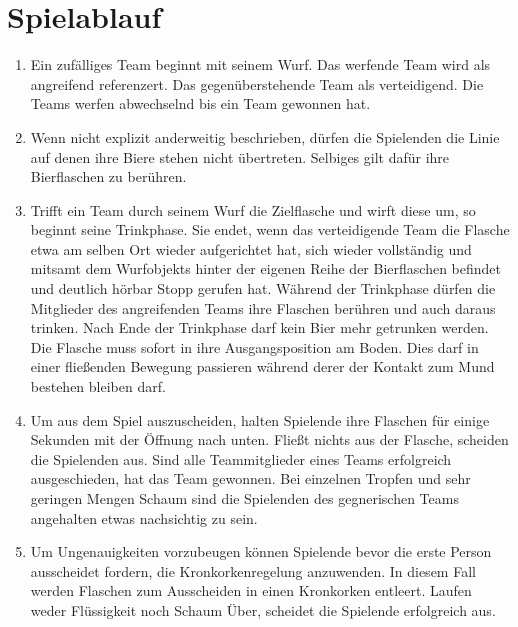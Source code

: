\section{Spielablauf}
\begin{enumerate}[label={(\arabic*)}]    
    \item
    Ein zufälliges Team beginnt mit seinem Wurf.
    Das werfende Team wird als \glqq{} angreifend \grqq{} referenzert.
    Das gegenüberstehende Team als \glqq{} verteidigend\grqq{}.
    Die Teams werfen abwechselnd bis ein Team gewonnen hat.

    \item
    Wenn nicht explizit anderweitig beschrieben, dürfen die Spielenden die Linie auf denen ihre Biere stehen nicht übertreten.
    Selbiges gilt dafür ihre Bierflaschen zu berühren.

    \item
    Trifft ein Team durch seinem Wurf die Zielflasche und wirft diese um, so beginnt seine Trinkphase.
    Sie endet, wenn das verteidigende Team die Flasche etwa am selben Ort wieder aufgerichtet hat, sich wieder vollständig und mitsamt dem Wurfobjekts hinter der eigenen Reihe der Bierflaschen befindet und deutlich hörbar \glqq{} Stopp\grqq{} gerufen hat.
    Während der Trinkphase dürfen die Mitglieder des angreifenden Teams ihre Flaschen berühren und auch daraus trinken.
    Nach Ende der Trinkphase darf kein Bier mehr getrunken werden.
    Die Flasche muss sofort in ihre Ausgangsposition am Boden.
    Dies darf in einer fließenden Bewegung passieren während derer der Kontakt zum Mund bestehen bleiben darf.

    \item
    Um aus dem Spiel auszuscheiden, halten Spielende ihre Flaschen für einige Sekunden mit der Öffnung nach unten.
    Fließt nichts aus der Flasche, scheiden die Spielenden aus.
    Sind alle Teammitglieder eines Teams erfolgreich ausgeschieden, hat das Team gewonnen.
    Bei einzelnen Tropfen und sehr geringen Mengen Schaum sind die Spielenden des gegnerischen Teams angehalten etwas nachsichtig zu sein.

    \item
    Um Ungenauigkeiten vorzubeugen können Spielende bevor die erste Person ausscheidet fordern, die Kronkorkenregelung anzuwenden.
    In diesem Fall werden Flaschen zum Ausscheiden in einen Kronkorken entleert.
    Laufen weder Flüssigkeit noch Schaum Über, scheidet die Spielende erfolgreich aus.
\end{enumerate}

